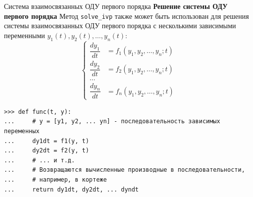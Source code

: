\documentclass[aspectratio=169, mathserif]{beamer}	%
\begin{document}
\begin{frame}[fragile, label=c]{Система взаимосвязанных ОДУ первого порядка}
\scriptsize
\textcolor{tpugreen}{\textbf{Решение системы ОДУ первого порядка}}
\vfill
	Метод \texttt{solve\_ivp} также может быть использован для решения системы взаимосвязанных ОДУ первого порядка с несколькими зависимыми переменными $y_1(t), y_2(t),\dots, y_n(t)$:
\vfill
\begin{equation*}
	\left\{
	\begin{aligned}
		\dfrac{dy_1}{dt} &= f_1\left(y_1, y_2,\dots, y_n; t\right)\\
		\dfrac{dy_2}{dt} &= f_2\left(y_1, y_2,\dots, y_n; t\right)\\
		\dots \\
		\dfrac{dy_n}{dt} &= f_n\left(y_1, y_2,\dots, y_n; t\right)
	\end{aligned}
	\right.
\end{equation*}
\vfill
\begin{verbatim}
>>> def func(t, y):
...     # y = [y1, y2, ... yn] - последовательность зависимых переменных
...     dy1dt = f1(y, t)
...     dy2dt = f2(y, t)
...     # ... и т.д.
...     # Возвращаются вычисленные производные в последовательности,
...     # например, в кортеже
...     return dy1dt, dy2dt, ... dyndt
\end{verbatim}
\vfil
\end{frame}
\end{document}
